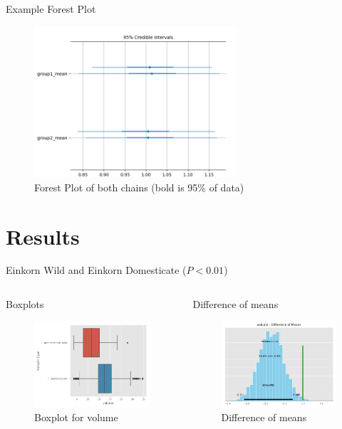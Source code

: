 \documentclass[t, aspectratio=169]{beamer}
\begin{document}
\begin{frame}[label={sec:org84672a1}]{Example Forest Plot}
\begin{figure}[htbp]
\centering
\includegraphics[width=7.5cm]{examplebayes3.png}
\caption{\label{fig:orgaa1a50c}
Forest Plot of both chains (bold is 95\% of data)}
\end{figure}
\end{frame}

\section{Results}
\label{sec:org58ad5a3}

\begin{frame}[label={sec:orgf0bf5f1}]{Einkorn Wild and Einkorn Domesticate (\(P<0.01\))}
\begin{columns}
\begin{column}{0.5\columnwidth}
\begin{block}{Boxplots}
\begin{figure}[htbp]
\centering
\includegraphics[width=4.5cm]{./images/monobox.png}
\caption{\label{fig:org9ac8b37}
Boxplot for volume}
\end{figure}
\end{block}
\end{column}

\begin{column}{0.5\columnwidth}
\begin{block}{Difference of means}
\begin{figure}[htbp]
\centering
\includegraphics[width=4.5cm]{./images/monodiff.png}
\caption{\label{fig:org257fc30}
Difference of means}
\end{figure}
\end{block}
\end{column}
\end{columns}
\end{frame}
\end{document}
